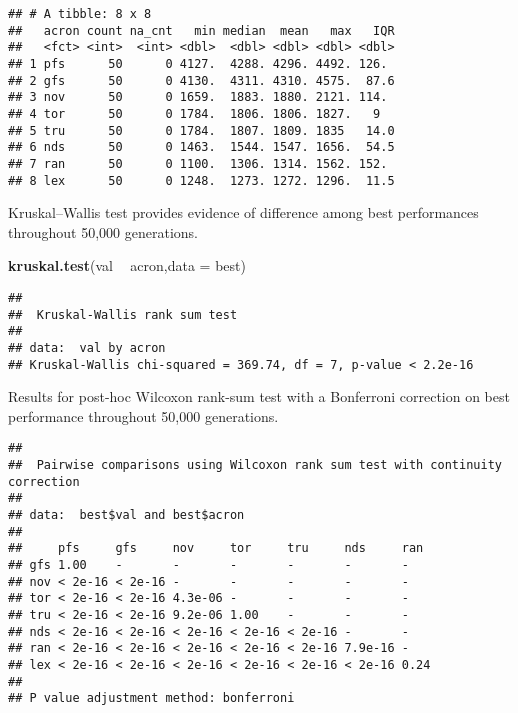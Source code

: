 \documentclass[]{book}
\newenvironment{Shaded}{\begin{snugshade}}{\end{snugshade}}
\newcommand{\DataTypeTok}[1]{\textcolor[rgb]{0.13,0.29,0.53}{#1}}
\newcommand{\KeywordTok}[1]{\textcolor[rgb]{0.13,0.29,0.53}{\textbf{#1}}}
\newcommand{\NormalTok}[1]{#1}
\newcommand{\OperatorTok}[1]{\textcolor[rgb]{0.81,0.36,0.00}{\textbf{#1}}}
\newcommand{\OtherTok}[1]{\textcolor[rgb]{0.56,0.35,0.01}{#1}}
\newcommand{\StringTok}[1]{\textcolor[rgb]{0.31,0.60,0.02}{#1}}
\begin{document}
\begin{verbatim}
## # A tibble: 8 x 8
##   acron count na_cnt   min median  mean   max   IQR
##   <fct> <int>  <int> <dbl>  <dbl> <dbl> <dbl> <dbl>
## 1 pfs      50      0 4127.  4288. 4296. 4492. 126. 
## 2 gfs      50      0 4130.  4311. 4310. 4575.  87.6
## 3 nov      50      0 1659.  1883. 1880. 2121. 114. 
## 4 tor      50      0 1784.  1806. 1806. 1827.   9  
## 5 tru      50      0 1784.  1807. 1809. 1835   14.0
## 6 nds      50      0 1463.  1544. 1547. 1656.  54.5
## 7 ran      50      0 1100.  1306. 1314. 1562. 152. 
## 8 lex      50      0 1248.  1273. 1272. 1296.  11.5
\end{verbatim}

Kruskal--Wallis test provides evidence of difference among best performances throughout 50,000 generations.

\begin{Shaded}
\begin{Highlighting}[]
\KeywordTok{kruskal.test}\NormalTok{(val }\OperatorTok{~}\StringTok{ }\NormalTok{acron,}\DataTypeTok{data =}\NormalTok{ best)}
\end{Highlighting}
\end{Shaded}

\begin{verbatim}
## 
##  Kruskal-Wallis rank sum test
## 
## data:  val by acron
## Kruskal-Wallis chi-squared = 369.74, df = 7, p-value < 2.2e-16
\end{verbatim}

Results for post-hoc Wilcoxon rank-sum test with a Bonferroni correction on best performance throughout 50,000 generations.

\begin{Shaded}
\end{Shaded}

\begin{verbatim}
## 
##  Pairwise comparisons using Wilcoxon rank sum test with continuity correction 
## 
## data:  best$val and best$acron 
## 
##     pfs     gfs     nov     tor     tru     nds     ran 
## gfs 1.00    -       -       -       -       -       -   
## nov < 2e-16 < 2e-16 -       -       -       -       -   
## tor < 2e-16 < 2e-16 4.3e-06 -       -       -       -   
## tru < 2e-16 < 2e-16 9.2e-06 1.00    -       -       -   
## nds < 2e-16 < 2e-16 < 2e-16 < 2e-16 < 2e-16 -       -   
## ran < 2e-16 < 2e-16 < 2e-16 < 2e-16 < 2e-16 7.9e-16 -   
## lex < 2e-16 < 2e-16 < 2e-16 < 2e-16 < 2e-16 < 2e-16 0.24
## 
## P value adjustment method: bonferroni
\end{verbatim}
\end{document}
